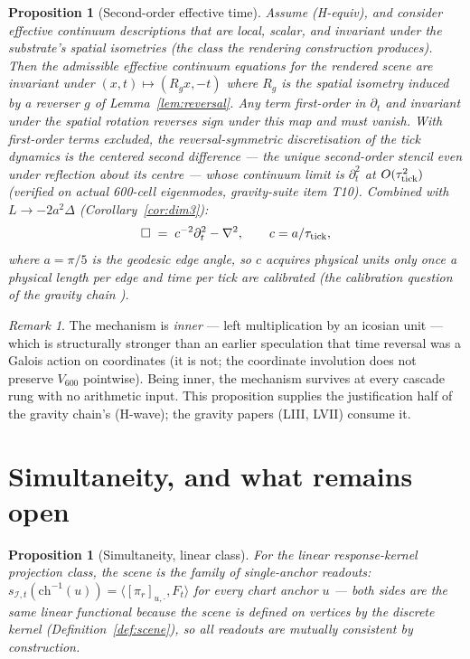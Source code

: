\documentclass[12pt]{article}
\newtheorem{proposition}[theorem]{Proposition}
\theoremstyle{definition}
\theoremstyle{remark}
\newtheorem{remark}[theorem]{Remark}
\newcommand{\Vsix}{V_{600}}
\begin{document}
\begin{proposition}[Second-order effective time]\label{prop:secondorder}
Assume (H-equiv), and consider effective continuum descriptions that are local, scalar, and invariant under the substrate's spatial isometries (the class the rendering construction produces). Then the admissible effective continuum equations for the rendered scene are invariant under $(x,t)\mapsto(R_gx, -t)$ where $R_g$ is the spatial isometry induced by a reverser $g$ of Lemma~\ref{lem:reversal}. Any term first-order in $\partial_t$ and invariant under the spatial rotation reverses sign under this map and must vanish. With first-order terms excluded, the reversal-symmetric discretisation of the tick dynamics is the centered second difference --- the unique second-order stencil even under reflection about its centre --- whose continuum limit is $\partial_t^2$ at $O(\tau_{\rm tick}^2)$ (verified on actual 600-cell eigenmodes, gravity-suite item T10). Combined with $L \to -2a^2\Delta$ (Corollary~\ref{cor:dim3}):
$$\Box \;=\; c^{-2}\partial_t^2 - \nabla^2, \qquad c = a/\tau_{\rm tick},$$ where $a = \pi/5$ is the geodesic edge angle, so $c$ acquires physical units only once a physical length per edge and time per tick are calibrated (the calibration question of the gravity chain \citep{SmartLIII}).

\end{proposition}

\begin{remark}
The mechanism is \emph{inner} --- left multiplication by an icosian unit --- which is structurally stronger than an earlier speculation that time reversal was a Galois action on coordinates (it is not; the coordinate involution does not preserve $\Vsix$ pointwise). Being inner, the mechanism survives at every cascade rung with no arithmetic input. This proposition supplies the justification half of the gravity chain's (H-wave); the gravity papers (LIII, LVII) consume it.
\end{remark}

\section{Simultaneity, and what remains open}\label{sec:open}

\begin{proposition}[Simultaneity, linear class]\label{prop:simul}
For the linear response-kernel projection class, the scene \emph{is} the family of single-anchor readouts: $s_{\mathcal I,t}(\mathrm{ch}^{-1}(u)) = \langle[\pi_r]_{u,\cdot}, F_t\rangle$ for every chart anchor $u$ --- both sides are the same linear functional because the scene is defined on vertices by the discrete kernel (Definition~\ref{def:scene}), so all readouts are mutually consistent by construction.
\end{proposition}
\end{document}
